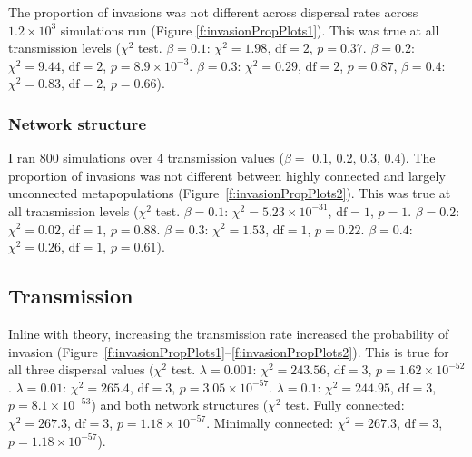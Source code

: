 The proportion of invasions was not different across dispersal rates across \ensuremath{1.2\times 10^{3}} simulations run (Figure \ref{f:invasionPropPlots1}).
This was true at all transmission levels ($\chi^2$ test. $\beta = 0.1$: $\chi^2 = 1.98$, $\text{df} = 2$, $p = 0.37$. $\beta = 0.2$: $\chi^2 = 9.44$, $\text{df} = 2$, $p = \ensuremath{8.9\times 10^{-3}}$. $\beta = 0.3$: $\chi^2 = 0.29$, $\text{df} = 2$, $p = 0.87$, $\beta = 0.4$: $\chi^2 = 0.83$, $\text{df} = 2$, $p = 0.66$).


\subsubsection{Network structure}

I ran 800 simulations over 4 transmission values ($\beta = $ 0.1, 0.2, 0.3, 0.4).
The proportion of invasions was not different between highly connected and largely unconnected metapopulations (Figure~\ref{f:invasionPropPlots2}). 
This was true at all transmission levels ($\chi^2$ test. $\beta = 0.1$: $\chi^2 = \ensuremath{5.23\times 10^{-31}}$, $\text{df} = 1$, $p = 1$. $\beta = 0.2$: $\chi^2 = 0.02$, $\text{df} = 1$, $p = 0.88$. $\beta = 0.3$: $\chi^2 = 1.53$, $\text{df} = 1$, $p = 0.22$. $\beta = 0.4$: $\chi^2 = 0.26$, $\text{df} = 1$, $p = 0.61$).

 
\subsection{Transmission}

Inline with theory, increasing the transmission rate increased the probability of invasion (Figure~\ref{f:invasionPropPlots1}--\ref{f:invasionPropPlots2}).
This is true for all three dispersal values ($\chi^2$ test. $\lambda = 0.001$: $\chi^2 = 243.56$, $\text{df} = 3$, $p = \ensuremath{1.62\times 10^{-52}}$. $\lambda = 0.01$: $\chi^2 = 265.4$, $\text{df} = 3$, $p = \ensuremath{3.05\times 10^{-57}}$. $\lambda = 0.1$: $\chi^2 = 244.95$, $\text{df} = 3$, $p = \ensuremath{8.1\times 10^{-53}}$) and both network structures ($\chi^2$ test. Fully connected: $\chi^2 = 267.3$, $\text{df} = 3$, $p = \ensuremath{1.18\times 10^{-57}}$. Minimally connected: $\chi^2 =  267.3$, $\text{df} = 3$, $p = \ensuremath{1.18\times 10^{-57}}$).




